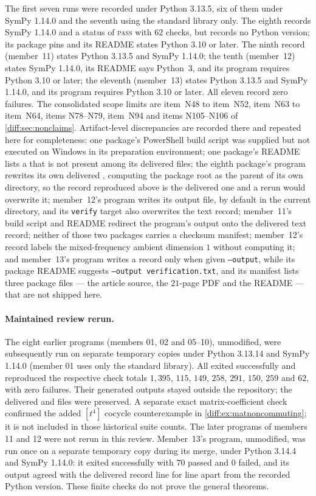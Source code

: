 \documentclass[11pt,letterpaper]{article}
\numberwithin{equation}{section}
\theoremstyle{definition}
\theoremstyle{remark}
\begin{document}
The first seven runs were recorded under Python 3.13.5, six of them under
SymPy 1.14.0 and the seventh using the standard library only. The eighth
records SymPy 1.14.0 and a status of \textsc{pass} with $62$ checks, but
records no Python version; its package pins  and its README
states Python 3.10 or later. The ninth record (member~11) states Python 3.13.5
and SymPy 1.14.0; the tenth (member~12) states SymPy 1.14.0, its README says
Python~3, and its program requires Python 3.10 or later; the eleventh
(member~13) states Python 3.13.5 and SymPy 1.14.0, and its program requires
Python 3.10 or later. All eleven record zero
failures. The consolidated scope limits are item~N48 to item~N52, item~N63 to
item~N64, items N78--N79, item~N94 and items N105--N106 of
\cref{diff:sec:nonclaims}.
Artifact-level discrepancies are recorded there and repeated here for
completeness: one package's PowerShell build script was supplied but not
executed on Windows in its preparation environment; one package's README lists a
 that is not present among its delivered files; the eighth
package's program rewrites its own delivered ,
computing the package root as the parent of its own directory, so the record
reproduced above is the delivered one and a rerun would overwrite it; member~12's
program writes its output file, by default  in the
current directory, and its \texttt{verify} target also overwrites the text record;
member~11's build script and README redirect the program's output onto the
delivered text record; neither of those two packages carries a checksum
manifest; member~12's record labels the mixed-frequency ambient dimension
$1$ without computing it; and member~13's program writes a record only when
given \texttt{--output}, while its package README suggests
\texttt{--output verification.txt}, and its manifest lists three package files
--- the article source, the $21$-page PDF and the README --- that are not
shipped here.

\paragraph{Maintained review rerun.}
The eight earlier programs (members 01, 02 and 05--10), unmodified, were
subsequently run on separate temporary copies under Python 3.13.14 and SymPy 1.14.0 (member 01 uses only the standard
library). All exited successfully and reproduced the respective check totals
$1{,}395$, $115$, $149$, $258$, $291$, $150$, $259$ and $62$, with zero
failures. Their generated outputs stayed outside the repository; the delivered
 and  files were preserved. A separate exact
matrix-coefficient check confirmed the added $[t^4]$ cocycle counterexample
in \cref{diff:ex:matnoncommuting}; it is not included in those historical
suite counts. The later programs of members 11 and 12 were not rerun in this
review. Member~13's program, unmodified, was run once on a separate temporary
copy during its merge, under Python 3.14.4 and SymPy 1.14.0: it exited
successfully with $70$ passed and $0$ failed, and its output agreed with the
delivered record line for line apart from the recorded Python version. These
finite checks do not prove the general theorems.
\end{document}
